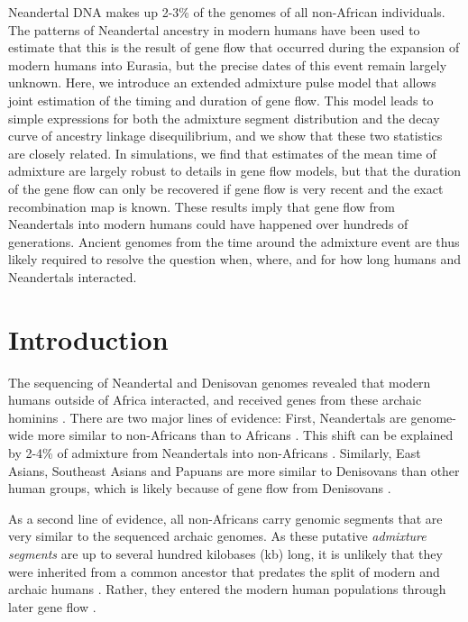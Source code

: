 \documentclass[11pt]{article}
\begin{document}
Neandertal DNA makes up 2-3\% of the genomes of all non-African individuals. The patterns of Neandertal ancestry in modern humans have been used to estimate that this is the result of gene flow that occurred during the expansion of modern humans into Eurasia, but the precise dates of this event remain largely unknown. Here, we introduce an extended admixture pulse model that allows joint estimation of the timing and duration of gene flow. This model leads to simple expressions for both the admixture segment distribution and the decay curve of ancestry linkage disequilibrium, and we show that these two statistics are closely related.  In simulations, we find that estimates of the mean time of admixture are largely robust to details in gene flow models, but that the duration of the gene flow can only be recovered if gene flow is very recent and the exact recombination map is known. These results imply that gene flow from Neandertals into modern humans could have happened over hundreds of generations. Ancient genomes from the time around the admixture event are thus likely required to resolve the question when, where, and for how long humans and Neandertals interacted.

\section{Introduction}\label{sec:introduction}

The sequencing of Neandertal  \citep{green_draft_2010,prufer_complete_2013,prufer_high-coverage_2017, mafessoni_high_coverage_2020} and Denisovan genomes \citep{reich_genetic_2010, meyer_high-coverage_2012} revealed that modern humans outside of Africa interacted, and received genes from these archaic hominins \citep{vernot_resurrecting_2014,fu_genome_2014,sankararaman_genomic_2014,fu_early_2015,malaspinas_genomic_2016,sankararaman_combined_2016,vernot_excavating_2016}. There are two major lines of evidence: First, Neandertals are genome-wide more similar to non-Africans than to Africans \citep{green_draft_2010}. This shift can be explained by 2-4\% of admixture from Neandertals into non-Africans \citep{green_draft_2010, prufer_complete_2013}. Similarly, East Asians, Southeast Asians and Papuans are more similar to Denisovans than other human groups, which is likely because of gene flow from Denisovans \citep{meyer_high-coverage_2012}. 

As a second line of evidence, all non-Africans carry genomic segments that are very similar to the sequenced archaic genomes. As these putative \emph{admixture segments} are up to several hundred kilobases (kb) long, it is unlikely that they were inherited from a common ancestor that predates the split of modern and archaic humans \citep{sankararaman_genomic_2014, vernot_resurrecting_2014}. Rather, they entered the modern human populations through later gene flow \citep{sankararaman_date_2012,sankararaman_genomic_2014, vernot_resurrecting_2014, sankararaman_combined_2016,vernot_excavating_2016}. 
\end{document}
